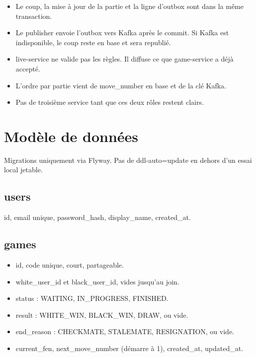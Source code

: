 \documentclass[11pt,a4paper]{article}
\newcommand{\field}[1]{{\ttfamily #1}}
\begin{document}
\begin{itemize}
  \item Le coup, la mise à jour de la partie et la ligne d'outbox sont dans la même transaction.
  \item Le publisher envoie l'outbox vers Kafka après le commit. Si Kafka est indisponible, le coup reste en base et sera republié.
  \item \field{live-service} ne valide pas les règles. Il diffuse ce que \field{game-service} a déjà accepté.
  \item L'ordre par partie vient de \field{move\_number} en base et de la clé Kafka.
  \item Pas de troisième service tant que ces deux rôles restent clairs.
\end{itemize}

\section{Modèle de données}

Migrations uniquement via Flyway. Pas de \field{ddl-auto=update} en dehors d'un essai local jetable.

\subsection{users}
\field{id}, \field{email} unique, \field{password\_hash}, \field{display\_name}, \field{created\_at}.

\subsection{games}
\begin{itemize}
  \item \field{id}, \field{code} unique, court, partageable.
  \item \field{white\_user\_id} et \field{black\_user\_id}, vides jusqu'au join.
  \item \field{status} : \field{WAITING}, \field{IN\_PROGRESS}, \field{FINISHED}.
  \item \field{result} : \field{WHITE\_WIN}, \field{BLACK\_WIN}, \field{DRAW}, ou vide.
  \item \field{end\_reason} : \field{CHECKMATE}, \field{STALEMATE}, \field{RESIGNATION}, ou vide.
  \item \field{current\_fen}, \field{next\_move\_number} (démarre à 1), \field{created\_at}, \field{updated\_at}.
\end{itemize}
\end{document}
